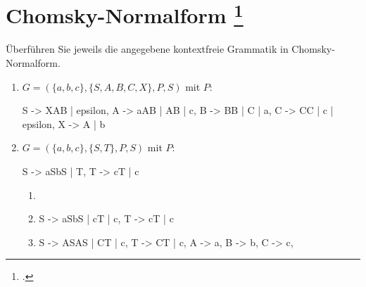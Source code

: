 \documentclass{lehramt-informatik-aufgabe}
\begin{document}
\let\schrittE=\liChomskySchrittUeberschriftErklaerung

\section{Chomsky-Normalform
\footcite{theo:ab:2}}

Überführen Sie jeweils die angegebene kontextfreie Grammatik in
Chomsky-Normalform.

\begin{enumerate}

%

\item $G = (\{a, b, c\}, \{S, A, B, C, X\}, P, S)$ mit $P$:

\begin{liProduktionsRegeln}
S -> XAB | epsilon,
A -> aAB | AB | c,
B -> BB | C | a,
C -> CC | c | epsilon,
X -> A | b
\end{liProduktionsRegeln}

%

\item $G = (\{a, b, c\}, \{S, T\}, P, S)$ mit $P$:

\begin{liProduktionsRegeln}
S -> aSbS | T,
T -> cT | c
\end{liProduktionsRegeln}

\begin{liAntwort}
\begin{enumerate}
\item \schrittE{1}

\liNichtsZuTun

\item \schrittE{2}

\begin{liProduktionsRegeln}
S -> aSbS | cT | c,
T -> cT | c
\end{liProduktionsRegeln}

\item \schrittE{3}

\begin{liProduktionsRegeln}
S -> ASAS | CT | c,
T -> CT | c,
A -> a,
B -> b,
C -> c,
\end{liProduktionsRegeln}


\end{enumerate}
\end{liAntwort}
\end{enumerate}
\end{document}
